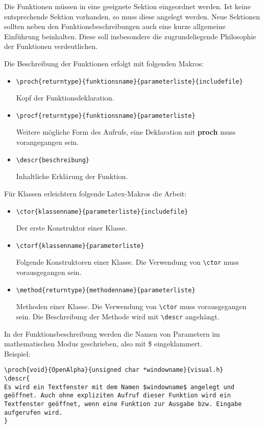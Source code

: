 Die Funktionen müssen in eine geeignete Sektion eingeordnet werden. Ist keine
entsprechende Sektion vorhanden, so muss diese angelegt werden. Neue Sektionen
sollten neben den Funktionsbeschreibungen auch eine kurze allgemeine Einführung
beinhalten. Diese soll insbesondere die zugrundeliegende Philosophie der
Funktionen verdeutlichen.

Die Beschreibung der Funktionen erfolgt mit folgenden Makros:
\begin{itemize}
\item
\begin{verbatim}
\proch{returntype}{funktionsname}{parameterliste}{includefile}
\end{verbatim}
Kopf der Funktionsdeklaration.
\item
\begin{verbatim}
\procf{returntype}{funktionsname}{parameterliste}
\end{verbatim}
Weitere mögliche Form des Aufrufs, eine Deklaration mit {\bf proch} muss
vorangegangen sein.
\item
\begin{verbatim}
\descr{beschreibung}
\end{verbatim}
Inhaltliche Erklärung der Funktion.
\end{itemize}

Für Klassen erleichtern folgende Latex-Makros die Arbeit:
\begin{itemize}
\item
\begin{verbatim}
\ctor{klassenname}{parameterliste}{includefile}
\end{verbatim}
Der erste Konstruktor einer Klasse.
\item
\begin{verbatim}
\ctorf{klassenname}{parameterliste}
\end{verbatim}
Folgende Konstruktoren einer Klasse. Die Verwendung von \verb+\ctor+ muss
vorausgegangen sein.
\item
\begin{verbatim}
\method{returntype}{methodenname}{parameterliste}
\end{verbatim}
Methoden einer Klasse. Die Verwendung von \verb+\ctor+ muss vorausgegangen 
sein. Die Beschreibung der Methode wird mit \verb+\descr+ angehängt.
\end{itemize}

In der Funktionsbeschreibung werden die Namen von Parametern im 
mathematischen Modus geschrieben, also mit \$ eingeklammert.\\

Beispiel:
\begin{verbatim}
\proch{void}{OpenAlpha}{unsigned char *windowname}{visual.h}
\descr{
Es wird ein Textfenster mit dem Namen $windowname$ angelegt und 
geöffnet. Auch ohne expliziten Aufruf dieser Funktion wird ein 
Textfenster geöffnet, wenn eine Funktion zur Ausgabe bzw. Eingabe 
aufgerufen wird.
}
\end{verbatim}


